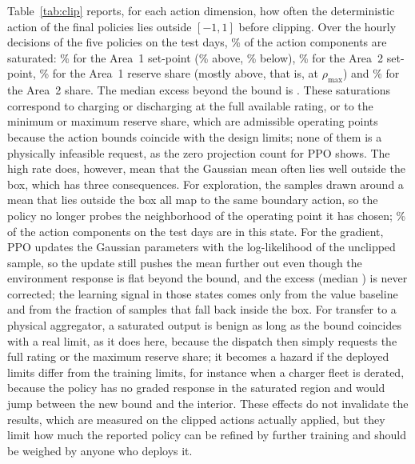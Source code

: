 Table~\ref{tab:clip} reports, for each action dimension, how often the
deterministic action of the final policies lies outside $[-1,1]$
before clipping. Over the \ClipDimSteps{} hourly decisions of the five
policies on the test days, \ClipDimAll\% of the action components are
saturated: \ClipDimPsetOne\% for the Area~1 set-point (\ClipAbovePsetOne\%
above, \ClipBelowPsetOne\% below), \ClipDimPsetTwo\% for the Area~2
set-point, \ClipDimRhoOne\% for the Area~1 reserve share (mostly above,
that is, at $\rho_{\max}$) and \ClipDimRhoTwo\% for the Area~2 share.
The median excess beyond the bound is \ClipMedianExcess. These
saturations correspond to charging or discharging at the full available
rating, or to the minimum or maximum reserve share, which are admissible
operating points because the action bounds coincide with the design
limits; none of them is a physically infeasible request, as the zero
projection count for PPO shows. The high rate does, however, mean that
the Gaussian mean often lies well outside the box, which has three
consequences. For exploration, the samples drawn around a mean that
lies outside the box all map to the same boundary action, so the
policy no longer probes the neighborhood of the operating point it
has chosen; \ClipDimAll\% of the action components on the test days are
in this state. For the gradient, PPO updates the Gaussian parameters
with the log-likelihood of the unclipped sample, so the update still
pushes the mean further out even though the environment response is
flat beyond the bound, and the excess (median \ClipMedianExcess) is
never corrected; the learning signal in those states comes only from
the value baseline and from the fraction of samples that fall back
inside the box. For transfer to a physical aggregator, a saturated
output is benign as long as the bound coincides with a real limit, as
it does here, because the dispatch then simply requests the full
rating or the maximum reserve share; it becomes a hazard if the
deployed limits differ from the training limits, for instance when a
charger fleet is derated, because the policy has no graded response
in the saturated region and would jump between the new bound and the
interior. These effects do not invalidate the results, which are
measured on the clipped actions actually applied, but they limit how
much the reported policy can be refined by further training and
should be weighed by anyone who deploys it.

